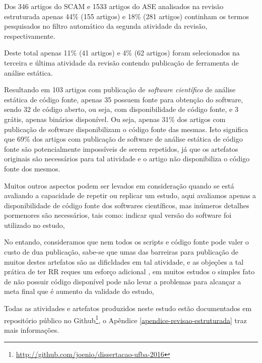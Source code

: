 Dos 346 artigos do SCAM e 1533 artigos do ASE analisados na revisão estruturada
apenas 44\% (155 artigos) e 18\% (281 artigos) continham os termos pesquisados
no filtro automático da segunda atividade da revisão, respectivamente.

Deste total apenas 11\% (41 artigos) e 4\% (62 artigos) foram selecionados na
terceira e última atividade da revisão contendo publicação de ferramenta de
análise estática.

Resultando em 103 artigos com publicação de {\it software científico} de
análise estática de código fonte, apenas 35 possuem fonte para obtenção do
software, sendo 32 de código aberto, ou seja, com disponibilidade de
código fonte, e 3 grátis, apenas binários disponível. Ou seja, apenas 31\% dos
artigos com publicação de software disponibilizam o código fonte das mesmas.
Isto significa que 69\% dos artigos com publicação de software de análise
estática de código fonte são potencialmente impossíveis de serem repetidos, já
que os artefatos originais são necessários para tal atividade e o artigo não
disponibiliza o código fonte dos mesmos.


Muitos outros aspectos podem ser levados em consideração quando se está
avaliando a capacidade de repetir ou replicar um estudo, aqui avaliamos apenas
a disponibilidade de código fonte dos softwares científicos, mas inúmeros detalhes
pormenores são necessários, tais como: indicar qual versão do software foi
utilizado no estudo, 

No entando, consideramos que nem todos os scripts e código fonte pode
valer o custo de dua publicação, sabe-se que umas das barreiras para publicação
de muitos destes artefatos são as dificldades em tal atividade,
e as objeções a tal prática de ter RR reques um esforço adicional \cite{madeyski2017would},
em muitos
estudos o simples fato de não possuir código disponível pode não levar
a problemas para alcançar a meta final que é aumento da validade do estudo,


Todas as atividades e artefatos produzidos neste estudo estão documentados em
repositório público no
Github\footnote{\url{http://github.com/joenio/dissertacao-ufba-2016}}, o
Apêndice \ref{apendice-revisao-estruturada} traz mais informações.


